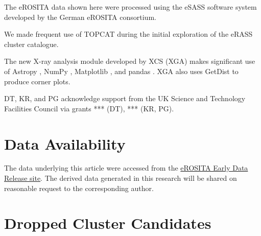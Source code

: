 \documentclass[fleqn,usenatbib]{mnras}
\begin{document}
The eROSITA data shown here were processed using the eSASS software system developed by the German eROSITA consortium.

We made frequent use of TOPCAT \citep[][]{topcat} during the initial exploration of the eRASS cluster catalogue.

The new X-ray analysis module developed by XCS (XGA) makes significant use of Astropy \citep[][]{astropy1, astropy2}, NumPy \citep[][]{numpy}, Matplotlib \citep[][]{matplotlib}, and pandas \citep[][]{pandassoftware,pandaspaper}. XGA also uses GetDist \citep[][]{getdist} to produce corner plots.

DT, KR, and PG acknowledge support from the UK Science and Technology Facilities Council via grants {\color{red}***} (DT), {\color{red}***} (KR, PG).
\section*{Data Availability}

The data underlying this article were accessed from the \href{https://erosita.mpe.mpg.de/edr/eROSITAObservations/Catalogues/}{eROSITA Early Data Release site}. The derived data generated in this research will be shared on reasonable request to the corresponding author.









\appendix

\section{Dropped Cluster Candidates}
\label{app:rejected}
\end{document}
